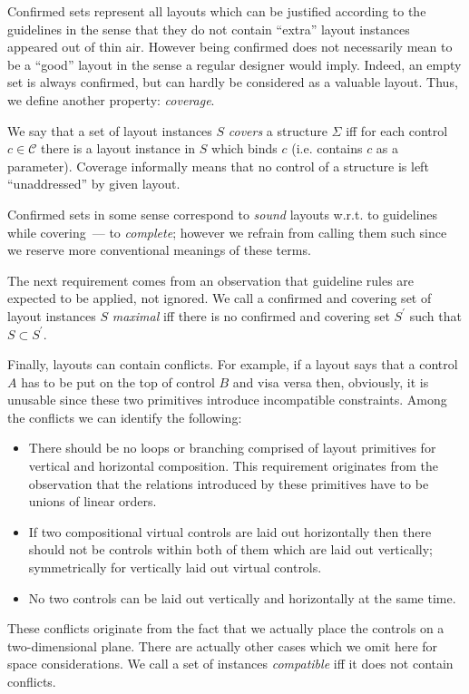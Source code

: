 Confirmed sets represent all layouts which can be justified according to the guidelines in the sense that they
do not contain ``extra'' layout instances appeared out of thin air. However being confirmed does not
necessarily mean to be a ``good'' layout in the sense a regular designer would imply. Indeed, an
empty set is always confirmed, but can hardly be considered as a valuable layout. Thus, we define
another property: \emph{coverage}.

We say that a set of layout instances $S$ \emph{covers} a structure $\Sigma$ iff for each control $c\in\mathcal{C}$
there is a layout instance in $S$ which binds $c$ (i.e. contains $c$ as a parameter). Coverage
informally means that no control of a structure is left ``unaddressed'' by given layout.

Confirmed sets in some sense correspond to \emph{sound} layouts w.r.t. to guidelines while covering~--- to
\emph{complete}; however we refrain from calling them such since we reserve more conventional meanings of these terms.

The next requirement comes from an observation that guideline rules are expected to be applied, not ignored. We
call a confirmed and covering set of layout instances $S$ \emph{maximal} iff there is no
confirmed and covering set $S^\prime$ such that $S\subset S^\prime$.

Finally, layouts can contain conflicts. For example, if a layout says that a control $A$ has to be put on
the top of control $B$ and visa versa then, obviously, it is unusable since these two primitives introduce
incompatible constraints. Among the conflicts we can identify the following:

\begin{itemize}
\item There should be no loops or branching comprised of layout primitives for vertical and horizontal composition. This
  requirement originates from the observation that the relations introduced by these
  primitives have to be unions of linear orders.
\item If two compositional virtual controls are laid out horizontally then there should not be
  controls within both of them which are laid out vertically; symmetrically for vertically
  laid out virtual controls.
\item No two controls can be laid out vertically and horizontally at the same time.
\end{itemize}

These conflicts originate from the fact that we actually place the controls on a two-dimensional plane.
There are actually other cases which we omit here for space considerations. We call a set of
instances \emph{compatible} iff it does not contain conflicts.

